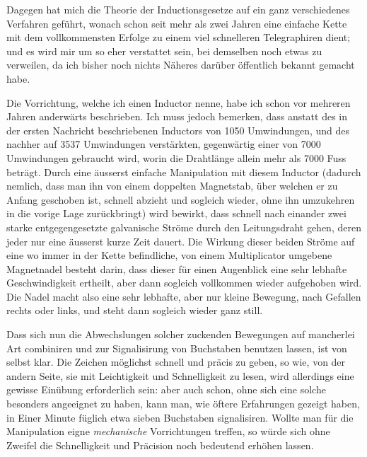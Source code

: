 Dagegen hat mich die Theorie der Inductionsgesetze auf ein ganz verschiedenes Verfahren geführt, wonach schon seit mehr als zwei Jahren eine einfache Kette mit dem vollkommensten Erfolge zu einem viel schnelleren Telegraphiren dient; und es wird mir um so eher verstattet sein, bei demselben noch etwas zu verweilen, da ich bisher noch nichts Näheres darüber öffentlich bekannt gemacht habe.

Die Vorrichtung, welche ich einen Inductor nenne, habe ich schon vor mehreren Jahren anderwärts beschrieben{\renewcommand{\thefootnote}{**)}}. Ich muss jedoch bemerken, dass anstatt des in der ersten Nachricht beschriebenen Inductors von 1050 Umwindungen, und des nachher auf 3537 Umwindungen verstärkten, gegenwärtig einer von 7000 Umwindungen gebraucht wird, worin die Drahtlänge allein mehr als 7000 Fuss beträgt. Durch eine äusserst einfache Manipulation mit diesem Inductor (dadurch nemlich, dass man ihn von einem doppelten Magnetstab, über welchen er zu Anfang geschoben ist, schnell abzieht und sogleich wieder, ohne ihn umzukehren in die vorige Lage zurückbringt) wird bewirkt, dass schnell nach einander zwei starke entgegengesetzte galvanische Ströme durch den Leitungsdraht gehen, deren jeder nur eine äusserst kurze Zeit dauert. Die Wirkung dieser beiden Ströme auf eine wo immer in der Kette befindliche, von einem Multiplicator umgebene Magnetnadel besteht darin, dass dieser für einen Augenblick eine sehr lebhafte Geschwindigkeit ertheilt, aber dann sogleich vollkommen wieder aufgehoben wird. Die Nadel macht also eine sehr lebhafte, aber nur kleine Bewegung, nach Gefallen rechts oder links, und steht dann sogleich wieder ganz still.

Dass sich nun die Abwechslungen solcher zuckenden Bewegungen auf mancherlei Art combiniren und zur Signalisirung von Buchstaben benutzen lassen, ist von selbst klar. Die Zeichen möglichst schnell und präcis zu geben, so wie, von der andern Seite, sie mit Leichtigkeit und Schnelligkeit zu lesen, wird allerdings eine gewisse Einübung erforderlich sein: aber auch schon, ohne sich eine solche besonders angeeignet zu haben, kann man, wie öftere Erfahrungen gezeigt haben, in Einer Minute füglich etwa sieben Buchstaben signalisiren. Wollte man für die Manipulation eigne \textit{mechanische} Vorrichtungen treffen, so würde sich ohne Zweifel die Schnelligkeit und Präcision noch bedeutend erhöhen lassen.

